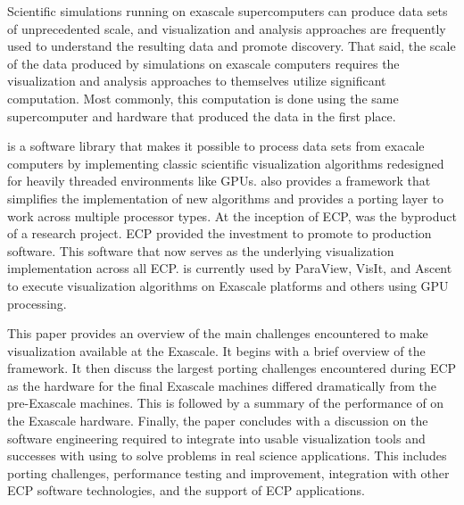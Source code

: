 Scientific simulations running on exascale supercomputers can produce data sets of unprecedented
scale, and
visualization and analysis approaches are frequently used to understand the resulting
data and promote discovery.
%
That said, the scale of the data produced by simulations on exascale computers requires
the visualization and analysis approaches to themselves utilize significant computation.
%
Most commonly, this computation is done using the same supercomputer and hardware that produced
the data in the first place.

\vtkm is a software library that makes it possible to process data sets from exacale computers
by implementing classic scientific visualization algorithms redesigned for heavily threaded environments like GPUs.
\vtkm also provides a framework that simplifies the implementation of new algorithms and provides a porting layer to work across multiple processor types.
At the inception of ECP, \vtkm was the byproduct of a research project.
ECP provided the investment to promote \vtkm to production software.
This software that now serves as the underlying visualization implementation across all ECP.
\vtkm is currently used by ParaView, VisIt, and Ascent to execute visualization algorithms on Exascale platforms and others using GPU processing.

This paper provides an overview of the main challenges encountered to make visualization available at the Exascale.
It begins with a brief overview of the \vtkm framework.
It then discuss the largest porting challenges encountered during ECP as the hardware for the final Exascale machines differed dramatically from the pre-Exascale machines.
This is followed by a summary of the performance of \vtkm on the Exascale hardware.
Finally, the paper concludes with a discussion on the software engineering required to integrate \vtkm into usable visualization tools and successes with using \vtkm to solve problems in real science applications.
This includes porting challenges, performance testing and improvement, integration with other ECP software technologies, and the support of ECP applications.
